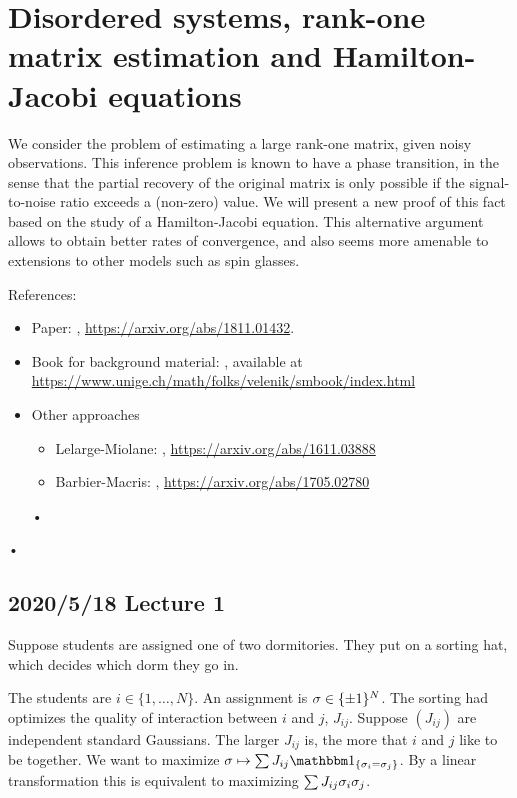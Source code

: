 \section{Disordered systems, rank-one matrix estimation and Hamilton-Jacobi equations}

We consider the problem of estimating a large rank-one matrix, given noisy observations. This inference problem is known to have a phase transition, in the sense that the partial recovery of the original matrix is only possible if the signal-to-noise ratio exceeds a (non-zero) value. We will present a new proof of this fact based on the study of a Hamilton-Jacobi equation. This alternative argument allows to obtain better rates of convergence, and also seems more amenable to extensions to other models such as spin glasses. 

References:
\begin{itemize}
\item
Paper: \cite{mourrat2018hamilton}, \url{https://arxiv.org/abs/1811.01432}.
\item
Book for background material: \cite{friedli2017statistical}, available at \url{https://www.unige.ch/math/folks/velenik/smbook/index.html}
\item Other approaches
\begin{itemize}
\item
Lelarge-Miolane: \cite{lelarge2019fundamental}, \url{https://arxiv.org/abs/1611.03888}
\item 
Barbier-Macris: \cite{barbier2019adaptive}, \url{https://arxiv.org/abs/1705.02780}
\end{itemize}•
\end{itemize}• 

\subsection*{2020/5/18 Lecture 1}

Suppose students are assigned one of two dormitories. They put on a sorting hat, which decides which dorm they go in.

The students are $i\in \{1,\ldots, N\}$. An assignment is $\sigma\in \{\pm 1\}^N$. 
The sorting had optimizes the quality of interaction between $i$ and $j$, $J_{ij}$. Suppose $(J_{ij})$ are independent standard Gaussians. The larger $J_{ij}$ is, the more that $i$ and $j$ like to be together. We want to maximize $\si\mapsto \sum J_{ij} \one_{\{\si_i=\si_j\}}$. By a linear transformation this is equivalent to maximizing $\sum J_{ij} \sigma_i\sigma_j$.

